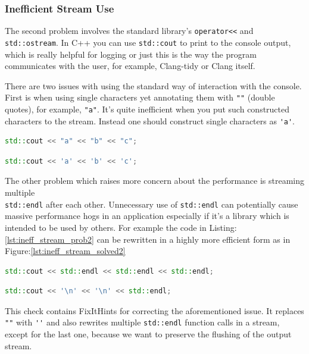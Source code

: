 \subsubsection{Inefficient Stream Use}
\par The second problem involves the standard library's \verb|operator<<| and \verb|std::ostream|. In C++ you can use
\verb|std::cout| to print to the console output, which is really helpful for logging or just this is the way the program communicates with the user, for example, Clang-tidy or Clang itself.\medskip
\par There are two issues with using the standard way of interaction with the console. First is when using single characters yet annotating them with \verb|""| (double quotes), for example, \verb|"a"|. It's quite inefficient when you put such constructed characters to the stream. Instead one should construct single characters as \verb|'a'|.\medskip
\begin{lstlisting}[language=c++, frame=single ,caption={Sightly inefficient way of streaming characters}, label={lst:ineff_stream_pro}]
std::cout << "a" << "b" << "c";
\end{lstlisting}
\begin{lstlisting}[language=c++, frame=single ,caption={A generally more efficient version}, label={lst:ineff_stream_solved}]
std::cout << 'a' << 'b' << 'c';
\end{lstlisting}
\par The other problem which raises more concern about the performance is streaming multiple \\\verb|std::endl| after each other. Unnecessary use of \verb|std::endl| can potentially cause massive performance hogs in an application especially if it's a library which is intended to be used by others. For example the code in Listing:\ref{lst:ineff_stream_prob2} can be rewritten in a highly more efficient form as in Figure:\ref{lst:ineff_stream_solved2}
\begin{lstlisting}[language=c++, frame=single ,caption={A really slow way to print newlines}, label={lst:ineff_stream_prob2}]
std::cout << std::endl << std::endl << std::endl;
\end{lstlisting}
\begin{lstlisting}[language=c++, frame=single ,caption={A more efficient version}, label={lst:ineff_stream_solved2}]
std::cout << '\n' << '\n' << std::endl;
\end{lstlisting}
\par This check contains FixItHints for correcting the aforementioned issue. It replaces \verb|""| with \verb|''| and also rewrites multiple \verb|std::endl| function calls in a stream, except for the last one, because we want to preserve the flushing of the output stream.
